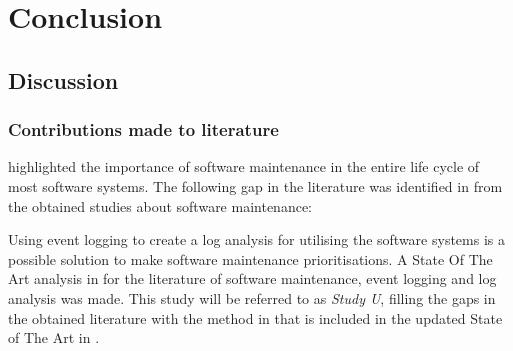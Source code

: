 \chapter{Conclusion}
\label{chap:4}

\section{Discussion}

\subsection{Contributions made to literature}
 highlighted the importance of software maintenance in the entire life cycle of most software systems. The following gap in the literature was identified in  from the obtained studies about software maintenance: 

\begin{center}
	\begin{tcolorbox}[colback=lightgray, colframe=black, sharp corners=all, arc=4pt]
		\begin{minipage}{\textwidth}
			\RaggedRight\textit{\studyGap}
		\end{minipage}
	\end{tcolorbox}
\end{center}

Using event logging to create a log analysis for utilising the software systems is a possible solution to make software maintenance prioritisations. A State Of The Art analysis in  for the literature of software maintenance, event logging and log analysis was made. This study will be referred to as \textit{Study U}, filling the gaps in the obtained literature with the method in  that is included in the updated State of The Art in .

